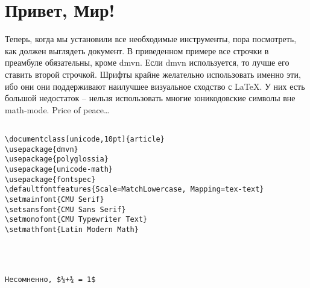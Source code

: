\section{Привет, Мир!}

Теперь, когда мы установили все необходимые инструменты, пора
посмотреть, как должен выглядеть документ. В приведенном примере все
строчки в преамбуле обязательны, кроме {\ttfamily dmvn}. Если dmvn
используется, то лучше его ставить второй строчкой.  Шрифты крайне
желательно использовать именно эти, ибо они они поддерживают наилучшее
визуальное сходство с \LaTeX. У них есть большой недостаток -- нельзя
использовать многие юникодовские символы вне math-mode.  Price of
peace…
\begin{verbatim}

\documentclass[unicode,10pt]{article}
\usepackage{dmvn}
\usepackage{polyglossia}
\usepackage{unicode-math}
\usepackage{fontspec}
\defaultfontfeatures{Scale=MatchLowercase, Mapping=tex-text}
\setmainfont{CMU Serif}
\setsansfont{CMU Sans Serif}
\setmonofont{CMU Typewriter Text}
\setmathfont{Latin Modern Math}




Несомненно, $¼+¾ = 1$

\end{verbatim}
